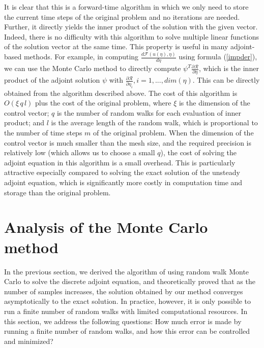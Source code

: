         It is clear that this is a forward-time algorithm in which we only
        need to store the current time steps of the original problem and
        no iterations are needed.  Further, it directly yields the inner
        product of the solution with the given vector.  Indeed, there is no
        difficulty with this algorithm to solve multiple linear functions
        of the solution vector at the same time.  This property is useful
        in many adjoint-based methods.  For example, in computing
        $ \frac{d\mathcal{F}(u(\eta),\eta)}{d\eta} $ using formula
        (\ref{impder}), we can use the Monte Carlo method to directly compute
        $ \psi^T \frac{\partial \mathcal{R}}{\partial \eta} $,
        which is the inner product of the adjoint solution $\psi$ with
        $\frac{\partial \mathcal{R}}{\partial \eta_i}, i=1,...,dim(\eta)$.
        This can be directly obtained from the algorithm described above.
        The cost of this algorithm is $O(\xi\, q\, l)$ plus the cost of
        the original problem, where $\xi$ is the dimension of the control
        vector; $q$ is the number of random walks for each evaluation of
        inner product; and $l$ is the average length of the random walk,
        which is proportional to the number of time steps $m$ of the original
        problem.  When the dimension of the control vector is much smaller
        than the mesh size, and the required precision is relatively low
        (which allows us to choose a small $q$), the cost of solving the
        adjoint equation in this algorithm is a small overhead.  This is
        particularly attractive especially compared to solving the exact
        solution of the unsteady adjoint equation, which is significantly
        more costly in computation time and storage than the original problem.
    


\section{Analysis of the Monte Carlo method}
    In the previous section, we derived the algorithm of using random walk Monte
    Carlo to solve the discrete adjoint equation, and theoretically proved that
    as the number of samples increases, the solution obtained by our method
    converges asymptotically to the exact solution.  In practice, however,
    it is only possible to run a finite number of random walks with limited
    computational resources.  In this section, we address the following
    questions: How much error is made by running a finite number of random
    walks, and how this error can be controlled and minimized?
    
